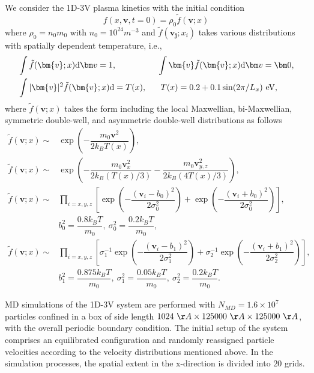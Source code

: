 \documentclass[preprint,1p,times]{elsarticle}
\theoremstyle{definition}
\theoremstyle{remark}
\begin{document}
We consider the 1D-3V plasma kinetics with the initial condition
\begin{equation*}
f(x, \bm v, t=0) = \rho_0  \tilde{f}(\bm{v}; x) 
\end{equation*}
where $\rho_0 = n_0 m_0$ with $n_0 = 10^{24} m^{-3}$ and $\tilde{f}(\bm{v}_{\bm{j}}; x_{i})$ takes various distributions with spatially dependent temperature, i.e.,  
\begin{equation}
\begin{aligned}
    &\int  \tilde{f}(\bm{v}; x) {\rm d} \bm v = 1 , 
    \quad \quad \qquad \quad \int \bm{v}  \tilde{f}(\bm{v}; x) {\rm d} \bm v = \bm 0, \\
    &\int \vert \bm{v} \vert^{2} \tilde{f}(\bm{v}; x) {\rm d} = T(x) , \quad~~
    T(x) = 0.2 + 0.1 \sin(2\pi/L_{x}) ~ \text{eV} ,
\end{aligned}    
\end{equation}
where $\tilde{f}(\bm{v}; x)$ takes the form including the local Maxwellian, bi-Maxwellian, symmetric double-well, and asymmetric double-well distributions as follows
\begin{equation}
\begin{aligned}
    \tilde{f}(\bm{v}; x) \sim& \exp\left( -\dfrac{m_{0} \bm{v}^{2}}{2k_{B}T(x)} \right) , \\
    \tilde{f}(\bm{v}; x) \sim& \exp\left( -\dfrac{m_{0} \bm{v}_{x}^{2}}{2k_{B}(T(x)/3)} - \dfrac{m_{0} \bm{v}_{y,z}^{2}}{2k_{B}(4T(x)/3)} \right) , \\
    \tilde{f}(\bm{v}; x) \sim& \prod_{i=x,y,z} \left[ \exp\left( -\dfrac{(\bm{v}_i-b_{0})^2}{2\sigma_{0}^2} \right) + \exp\left( -\dfrac{(\bm{v}_i+b_{0})^2}{2\sigma_{0}^2} \right) \right], \\
    & b_{0}^{2} = \dfrac{0.8 k_{B} T}{m_{0}}, ~ \sigma_{0}^{2} = \dfrac{0.2 k_{B} T}{m_{0}} , \\
    \tilde{f}(\bm{v}; x) \sim& \prod_{i=x,y,z} \left[ \sigma_{1}^{-1} \exp\left( -\dfrac{(\bm{v}_i-b_{1})^2}{2\sigma_{1}^2} \right) + \sigma_{2}^{-1} \exp\left( -\dfrac{(\bm{v}_i+b_{1})^2}{2\sigma_{2}^2} \right) \right], \\
    & b_{1}^{2} = \dfrac{0.875 k_{B} T}{m_{0}}, ~ \sigma_{1}^{2} = \dfrac{0.05 k_{B} T}{m_{0}}, ~ \sigma_{2}^{2} = \dfrac{0.2 k_{B} T}{m_{0}} .
\end{aligned}
\end{equation}


MD simulations of the 1D-3V system are performed with $N_{MD} = 1.6 \times 10^{7}$ particles confined in a box of side length $1024~\AA \times 125000~\AA \times 125000~\AA$, with the overall periodic boundary condition.
The initial setup of the system comprises an equilibrated configuration and randomly reassigned particle velocities according to the velocity distributions mentioned above.
In the simulation processes, the spatial extent in the x-direction is divided into $20$ grids.
\end{document}
